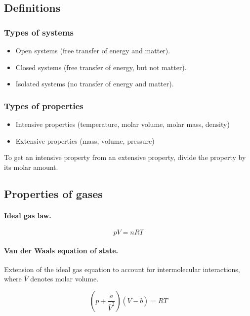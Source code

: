 \documentclass{article}
\numberwithin{theorem}{section}
\numberwithin{corollary}{section}
\numberwithin{postulate}{section}
\numberwithin{lemma}{section}
\numberwithin{definition}{section}
\begin{document}
\subsection{Definitions}

\subsubsection{Types of systems}
\begin{itemize}
  \item Open systems (free transfer of energy and matter).
  \item Closed systems (free transfer of energy, but not matter).
  \item Isolated systems (no transfer of energy and matter).
\end{itemize}

\subsubsection{Types of properties}
\begin{itemize}
  \item{Intensive properties (temperature, molar volume, molar mass, density)}
  \item{Extensive properties (mass, volume, pressure)}
\end{itemize}

To get an intensive property from an extensive property, divide the property by
its molar amount.

\subsection{Properties of gases}

\paragraph{Ideal gas law. }
\begin{equation}
  pV = nRT
\end{equation}

\paragraph{Van der Waals equation of state.} Extension of the ideal gas equation
to account for intermolecular interactions, where $\overline{V}$ denotes molar
volume. 

\begin{equation}
  \left( p + \frac{a}{\overline{V}^2} \right) (\overline{V} - b) = RT 
\end{equation}
\end{document}
